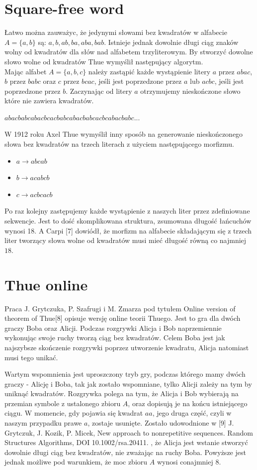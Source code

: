 \documentclass[document]{xmgr}
\begin{document}
\section{Square-free word}
Łatwo można zauważyc, że jedynymi słowami bez kwadratów w alfabecie $A = \{a, b\}$ są: $a, b, ab, ba, aba, bab$. Istnieje jednak dowolnie długi ciąg znaków wolny od kwadratów dla słów nad alfabetem trzyliterowym. By stworzyć dowolne słowo wolne od kwadratów Thue wymyślił następujący algorytm.\\
Mając alfabet $A = \{a, b, c\}$ należy zastąpić każde wystąpienie litery $a$ przez $abac$,  $b$ przez $babc$ oraz $c$ przez $bcac$, jeśli jest poprzedzone przez $a$ lub $acbc$, jeśli jest poprzedzone przez $b$. Zaczynając od litery $a$ otrzymujemy nieskończone słowo które nie zawiera kwadratów.

{\centering $abacbabcabacbcacbabcabacbabcacbcabacbabc...$ \par}

W 1912 roku Axel Thue wymyślił inny sposób na generowanie nieskończonego słowa bez kwadratów na trzech literach z użyciem następującego morfizmu. 
\begin{itemize}
\item $a \to abcab$
\item $b \to acabcb$
\item $c \to acbcacb$
\end{itemize}


Po raz kolejny zastępujemy każde wystąpienie z naszych liter przez zdefiniowane sekwencje. Jest to dość skomplikowana struktura, zsumowana długość łańcuchów wynosi 18. A Carpi [7] dowiódł, że morfizm na alfabecie składającym się z trzech liter tworzący słowa wolne od kwadratów musi mieć długość równą co najmniej $18$.

\section{Thue online}
Praca J. Grytczuka, P. Szafrugi i M. Zmarza pod tytułem Online version of theorem of Thue[8] opisuje wersję online teorii Thuego. Jest to gra dla dwóch graczy Boba oraz Alicji. Podczas rozgrywki Alicja i Bob naprzemiennie wykonując swoje ruchy tworzą ciąg bez kwadratów. Celem Boba jest jak najszybsze skończenie rozgrywki poprzez utworzenie kwadratu, Alicja natomiast musi tego unikać.

Wartym wspomnienia jest uproszczony tryb gry, podczas którego mamy dwóch graczy - Alicję i Boba, tak jak zostało wspomniane, tylko Alicji zależy na tym by uniknąć kwadratów. Rozgrywka polega na tym, że Alicja i Bob wybierają na przemian symbole z ustalonego zbioru $A$, oraz dopisują je na końcu istniejącego ciągu. W momencie, gdy pojawia się kwadrat $aa$, jego druga część, czyli w naszym przypadku prawe $a$, zostaje usunięte. Zostało udowodnione w [9] J. Grytczuk, J. Kozik, P. Micek, New approach to nonrepetitive sequences. Random Structures Algorithms, DOI 10.1002/rsa.20411. , że Alicja jest wstanie stworzyć dowolnie długi ciąg bez kwadratów, nie zważając na ruchy Boba. Powyższe jest jednak możliwe pod warunkiem, że moc zbioru $A$ wynosi conajmniej $8$.
\end{document}

